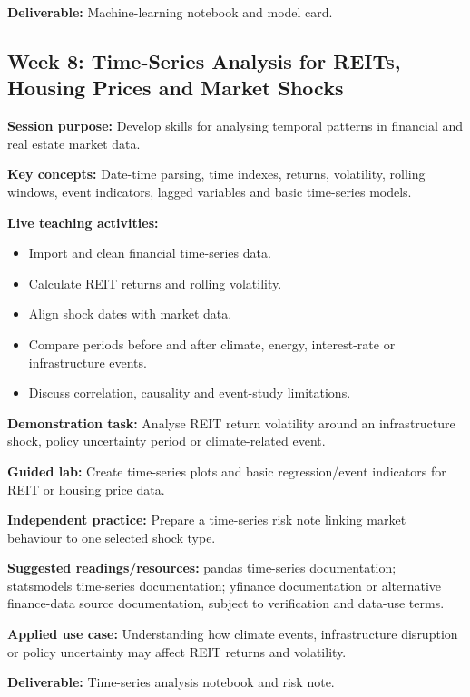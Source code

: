 \documentclass[
  a4paper,
]{article}
\providecommand{\tightlist}{%
  \setlength{\itemsep}{0pt}\setlength{\parskip}{0pt}}
\begin{document}
\textbf{Deliverable:} Machine-learning notebook and model card.

\subsection{Week 8: Time-Series Analysis for REITs, Housing Prices and
Market
Shocks}\label{week-8-time-series-analysis-for-reits-housing-prices-and-market-shocks}

\textbf{Session purpose:} Develop skills for analysing temporal patterns
in financial and real estate market data.

\textbf{Key concepts:} Date-time parsing, time indexes, returns,
volatility, rolling windows, event indicators, lagged variables and
basic time-series models.

\textbf{Live teaching activities:}

\begin{itemize}
\tightlist
\item
  Import and clean financial time-series data.
\item
  Calculate REIT returns and rolling volatility.
\item
  Align shock dates with market data.
\item
  Compare periods before and after climate, energy, interest-rate or
  infrastructure events.
\item
  Discuss correlation, causality and event-study limitations.
\end{itemize}

\textbf{Demonstration task:} Analyse REIT return volatility around an
infrastructure shock, policy uncertainty period or climate-related
event.

\textbf{Guided lab:} Create time-series plots and basic regression/event
indicators for REIT or housing price data.

\textbf{Independent practice:} Prepare a time-series risk note linking
market behaviour to one selected shock type.

\textbf{Suggested readings/resources:} pandas time-series documentation;
statsmodels time-series documentation; yfinance documentation or
alternative finance-data source documentation, subject to verification
and data-use terms.

\textbf{Applied use case:} Understanding how climate events,
infrastructure disruption or policy uncertainty may affect REIT returns
and volatility.

\textbf{Deliverable:} Time-series analysis notebook and risk note.
\end{document}
